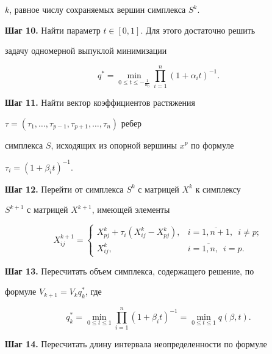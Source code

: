 $k$, равное числу сохраняемых вершин симплекса $S^k$.





{\bf Шаг 10.} Найти параметр $t\in[0,1]$. Для этого достаточно решить


задачу одномерной выпуклой минимизации


$$


q^*=\min_{0\le t\le-\frac{1}{\alpha_0}}\prod^n_{i=1}(1+\alpha_it)^{-1}.


$$





{\bf Шаг 11.} Найти вектор коэффициентов растяжения


$\tau=(\tau_1,\dotsc,\tau_{p-1},\tau_{p+1},\dotsc,\tau_n)$ ребер


симплекса $S$, исходящих из опорной вершины $x^p$ по формуле


$\tau_i=(1+\beta_it)^{-1}$.





{\bf Шаг 12.} Перейти от симплекса $S^k$ с матрицей $X^k$ к симплексу


$S^{k+1}$ с матрицей $X^{k+1}$, имеющей элементы


$$


X^{k+1}_{ij}=


\begin{cases}


X^k_{pj}+\tau_i(X^k_{ij}-X^k_{pj}),& i=\overline{1,n+1},\;


\ i\ne p;\\


X^k_{ij},& i=\overline{1,n},\; \ i=p.


\end{cases}


$$





{\bf Шаг 13.} Пересчитать объем симплекса, содержащего решение, по


формуле $V_{k+1}=V_kq^*_k$, где


$$


q^*_k=\min_{0\le t\le 1}\prod^n_{i=1}(1+\beta_it)^{-1}=


\min_{0\le t\le 1}q(\beta,t).


$$





{\bf Шаг 14.} Пересчитать длину интервала неопределенности по формуле


